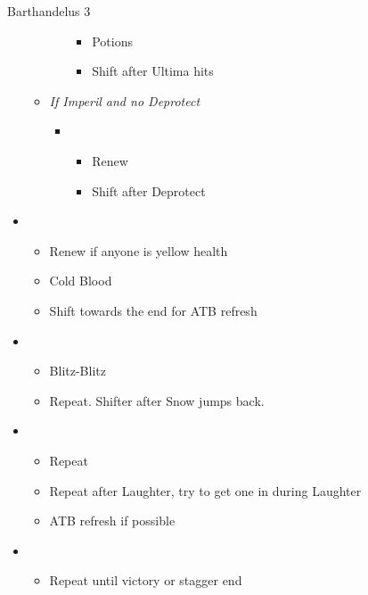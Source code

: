 \begin{battle}[1:24]{Barthandelus 3}
\begin{multicols}{2}
\begin{itemize}
\begin{itemize}
\begin{itemize}
\begin{itemize}
                              \item Potions
                              \item Shift after Ultima hits
                            \end{itemize}
                    \end{itemize}
              \item \textit{If Imperil and no Deprotect}
                    \begin{itemize}
                      \item \fifth
                            \begin{itemize}
                              \item Renew
                              \item Shift after Deprotect
                            \end{itemize}
                    \end{itemize}
            \end{itemize}
      \item \sixth
            \begin{itemize}
              \item Renew if anyone is yellow health
              \item Cold Blood
              \item Shift towards the end for ATB refresh
            \end{itemize}
      \item \second
            \begin{itemize}
              \item Blitz-Blitz
              \item Repeat. Shifter after Snow jumps back.
            \end{itemize}
      \item \first
            \begin{itemize}
              \item Repeat
              \item Repeat after Laughter, try to get one in during Laughter
              \item ATB refresh if possible
            \end{itemize}
      \item \second
            \begin{itemize}
              \item Repeat until victory or stagger end
            \end{itemize}

\end{itemize}
\end{multicols}
\end{battle}
